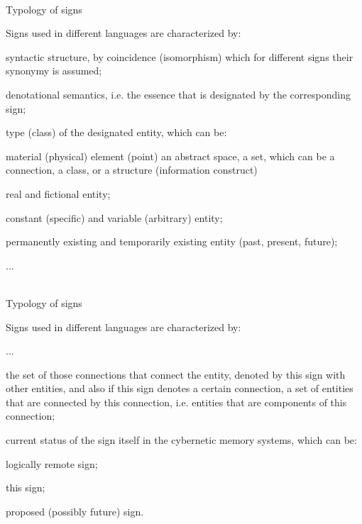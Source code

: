 \begin{frame}{\\Typology of signs}
	\topline
	\justifying
	\small
	
	\vspace{10mm}
	Signs used in different languages are characterized by:
	\begin{textitemize}
		\item syntactic structure, by coincidence (isomorphism)
		which for different signs their synonymy is assumed;
		\item denotational semantics, i.e. the essence that
		is designated by the corresponding sign;
		\item type (class) of the designated entity, which can
		be:
		\begin{textitemize}
			\item material (physical) element (point)
			an abstract space, a set, which can be a connection, a class, or a structure (information construct)
			\item real and fictional entity;
			\item constant (specific) and variable
			(arbitrary) entity;
			\item permanently existing and temporarily existing
			entity (past, present, future);
		\end{textitemize}
		\item ...
	\end{textitemize}
	
\end{frame}

\begin{frame}{\\Typology of signs}
	\topline
	\justifying
	\small
	
	\vspace{10mm}
	Signs used in different languages are characterized by:
	\begin{textitemize}
		\item ...
		\item the set of those connections that connect the entity,
		denoted by this sign with other entities, and also if this sign
		denotes a certain connection, a set of entities that are connected by this connection,
		i.e. entities that are components of this connection;
		\item current status of the sign itself in the cybernetic memory
		systems, which can be:
		\begin{textitemize}
			\item logically remote sign;
			\item this sign;
			\item proposed (possibly future) sign.
		\end{textitemize}
	\end{textitemize}
	
\end{frame}

